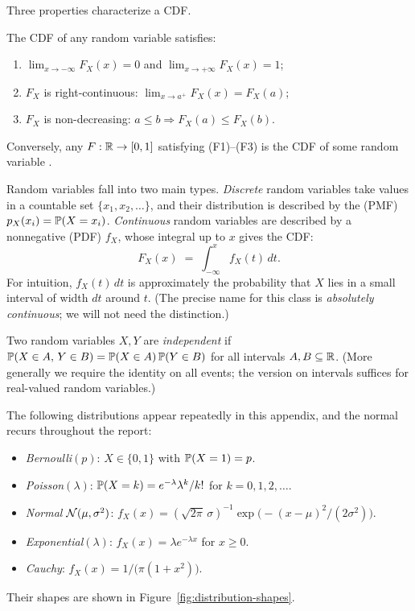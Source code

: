 Three properties characterize a CDF.

\begin{proposition}\label{prop:cdf-characterization}
The CDF of any random variable satisfies:
\begin{enumerate}[label=\textnormal{(F\arabic*)},leftmargin=*]
  \item \(\displaystyle\lim_{x \to -\infty} F_X(x) = 0\) and \(\displaystyle\lim_{x \to +\infty} F_X(x) = 1\);
  \item \(F_X\) is right-continuous: \(\lim_{x \to a^+} F_X(x) = F_X(a)\);
  \item \(F_X\) is non-decreasing: \(a \le b \Rightarrow F_X(a) \le F_X(b)\).
\end{enumerate}
Conversely, any \(F: \mathbb{R} \to [0,1]\) satisfying (F1)--(F3) is the CDF of some random variable \citep[][\S 1.5]{Casella2002}.
\end{proposition}

Random variables fall into two main types. \emph{Discrete} random variables take values in a countable set \(\{x_1, x_2, \ldots\}\), and their distribution is described by the  (PMF) \(p_X(x_i) = \mathbb{P}(X = x_i)\). \emph{Continuous} random variables are described by a nonnegative  (PDF) \(f_X\), whose integral up to \(x\) gives the CDF:
\[
  F_X(x) \;=\; \int_{-\infty}^x f_X(t)\, dt.
\]
For intuition, \(f_X(t)\,dt\) is approximately the probability that \(X\) lies in a small interval of width \(dt\) around \(t\). (The precise name for this class is \emph{absolutely continuous}; we will not need the distinction.)

Two random variables \(X, Y\) are \emph{independent} if \(\mathbb{P}(X \in A,\, Y \in B) = \mathbb{P}(X \in A)\, \mathbb{P}(Y \in B)\) for all intervals \(A, B \subseteq \mathbb{R}\). (More generally we require the identity on all events; the version on intervals suffices for real-valued random variables.)

\begin{example}\label{ex:common-distributions}
The following distributions appear repeatedly in this appendix, and the normal recurs throughout the report:
\begin{itemize}[leftmargin=1.5em,itemsep=0.25em]
  \item \emph{Bernoulli}\((p)\): \(X \in \{0, 1\}\) with \(\mathbb{P}(X = 1) = p\).
  \item \emph{Poisson}\((\lambda)\): \(\mathbb{P}(X = k) = e^{-\lambda} \lambda^k / k!\) for \(k = 0, 1, 2, \ldots\).
  \item \emph{Normal} \(\mathcal{N}(\mu, \sigma^2)\): \(f_X(x) = (\sqrt{2\pi}\,\sigma)^{-1} \exp\!\bigl(-(x - \mu)^2/(2\sigma^2)\bigr)\).
  \item \emph{Exponential}\((\lambda)\): \(f_X(x) = \lambda e^{-\lambda x}\) for \(x \ge 0\).
  \item \emph{Cauchy}: \(f_X(x) = 1 / \bigl(\pi (1 + x^2)\bigr)\).
\end{itemize}
Their shapes are shown in Figure~\ref{fig:distribution-shapes}.
\end{example}


